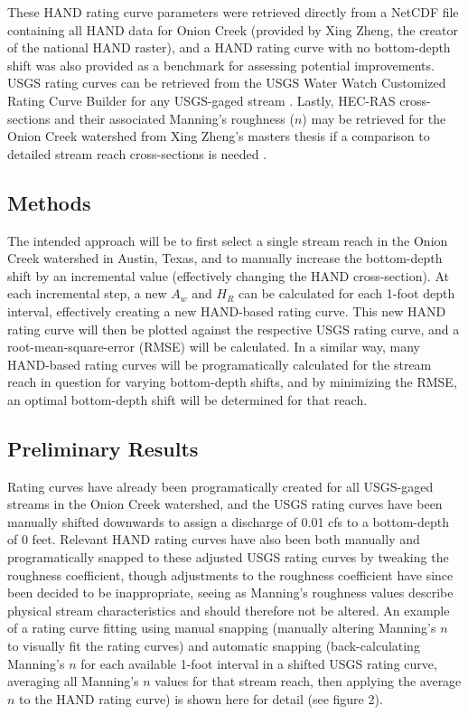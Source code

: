 \documentclass[11pt]{article}
\begin{document}
  These HAND rating curve parameters were retrieved directly from a NetCDF file containing all HAND data for Onion Creek (provided by Xing Zheng, the creator of the national HAND raster), and a HAND rating curve with no bottom-depth shift was also provided as a benchmark for assessing potential improvements. USGS rating curves can be retrieved from the USGS Water Watch Customized Rating Curve Builder for any USGS-gaged stream \cite{usgswaterwatch}. Lastly, HEC-RAS cross-sections and their associated Manning's roughness ($n$) may be retrieved for the Onion Creek watershed from Xing Zheng's masters thesis if a comparison to detailed stream reach cross-sections is needed \cite{xingms}.

  \subsection*{Methods} %

  The intended approach will be to first select a single stream reach in the Onion Creek watershed in Austin, Texas, and to manually increase the bottom-depth shift by an incremental value (effectively changing the HAND cross-section). At each incremental step, a new $A_w$ and $H_R$ can be calculated for each 1-foot depth interval, effectively creating a new HAND-based rating curve. This new HAND rating curve will then be plotted against the respective USGS rating curve, and a root-mean-square-error (RMSE) will be calculated. In a similar way, many HAND-based rating curves will be programatically calculated for the stream reach in question for varying bottom-depth shifts, and by minimizing the RMSE, an optimal bottom-depth shift will be determined for that reach. 

  \subsection*{Preliminary Results} %

  Rating curves have already been programatically created for all USGS-gaged streams in the Onion Creek watershed, and the USGS rating curves have been manually shifted downwards to assign a discharge of 0.01 cfs to a bottom-depth of 0 feet. Relevant HAND rating curves have also been both manually and programatically snapped to these adjusted USGS rating curves by tweaking the roughness coefficient, though adjustments to the roughness coefficient have since been decided to be inappropriate, seeing as Manning's roughness values describe physical stream characteristics and should therefore not be altered. An example of a rating curve fitting using manual snapping (manually altering Manning's $n$ to visually fit the rating curves) and automatic snapping (back-calculating Manning's $n$ for each available 1-foot interval in a shifted USGS rating curve, averaging all Manning's $n$ values for that stream reach, then applying the average $n$ to the HAND rating curve) is shown here for detail (see figure 2). 
\end{document}
